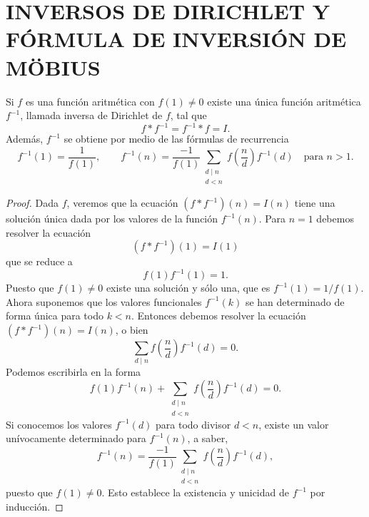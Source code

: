 \documentclass[12pt,a4paper]{book}
\begin{document}
    \section{INVERSOS DE DIRICHLET Y FÓRMULA DE INVERSIÓN DE MÖBIUS}

    \begin{teorema}
        Si $f$ es una función aritmética con $f(1)\neq0$ existe una única función
        aritmética $f^{-1}$, llamada inversa de Dirichlet de $f$, tal que
        \begin{equation*}
            f*f^{-1}=f^{-1}*f=I.
        \end{equation*}
        Además, $f^{-1}$ se obtiene por medio de las fórmulas de recurrencia
        \begin{equation*}
            f^{-1}(1)=\frac{1}{f(1)},\qquad
            f^{-1}(n)=\frac{-1}{f(1)}\sum_{\substack{d\mid n\\ d<n}}
            f\left(\frac{n}{d}\right)f^{-1}(d)\quad\text{para } n>1.
        \end{equation*}
    \end{teorema}

    \begin{proof}
        Dada $f$, veremos que la ecuación $(f*f^{-1})(n)=I(n)$ tiene una solución única
        dada por los valores de la función $f^{-1}(n)$. Para $n=1$ debemos resolver la
        ecuación
        \begin{equation*}
            (f*f^{-1})(1)=I(1)
        \end{equation*}
        que se reduce a
        \begin{equation*}
            f(1)f^{-1}(1)=1.
        \end{equation*}
        Puesto que $f(1)\neq0$ existe una solución y sólo una, que es $f^{-1}(1)=1/f(1)$.
        Ahora suponemos que los valores funcionales $f^{-1}(k)$ se han determinado de forma
        única para todo $k<n$. Entonces debemos resolver la ecuación $(f*f^{-1})(n)=I(n)$,
        o bien
        \begin{equation*}
            \sum_{d\mid n}f\left(\frac{n}{d}\right)f^{-1}(d)=0.
        \end{equation*}
        Podemos escribirla en la forma
        \begin{equation*}
            f(1)f^{-1}(n)+\sum_{\substack{d\mid n\\ d<n}}f\left(\frac{n}{d}\right)f^{-1}(d)=0.
        \end{equation*}
        Si conocemos los valores $f^{-1}(d)$ para todo divisor $d<n$, existe un valor
        unívocamente determinado para $f^{-1}(n)$, a saber,
        \begin{equation*}
            f^{-1}(n)=\frac{-1}{f(1)}\sum_{\substack{d\mid n\\ d<n}}
            f\left(\frac{n}{d}\right)f^{-1}(d),
        \end{equation*}
        puesto que $f(1)\neq0$. Esto establece la existencia y unicidad de $f^{-1}$ por
        inducción.
    \end{proof}
\end{document}
